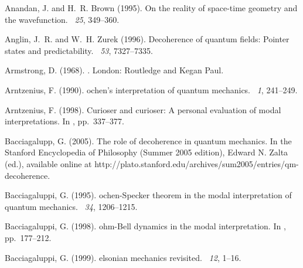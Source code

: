 \documentclass[12pt]{article}
\begin{document}
\begin{thebibliography}{}
Anandan, J. and H.~R. Brown (1995).
\newblock On the reality of space-time geometry and the wavefunction.
~{\em 25}, 349--360.

Anglin, J.~R. and W.~H. Zurek (1996).
\newblock Decoherence of quantum fields: Pointer states and predictability.
~{\em 53}, 7327--7335.

Armstrong, D. (1968).
.
\newblock London: Routledge and Kegan Paul.

Arntzenius, F. (1990).
ochen's interpretation of quantum mechanics.
~{\em 1},
  241--249.

Arntzenius, F. (1998).
\newblock Curioser and curioser: A personal evaluation of modal
  interpretations.
\newblock In , pp.\  337--377.

Bacciagalupp, G. (2005).
\newblock The role of decoherence in quantum mechanics.
\newblock In the Stanford Encyclopedia of Philosophy (Summer 2005 edition),
  Edward N. Zalta (ed.), available online at
  http://plato.stanford.edu/archives/sum2005/entries/qm-decoherence.

Bacciagaluppi, G. (1995).
ochen-{S}pecker theorem in the modal interpretation of quantum
  mechanics.
~{\em 34},
  1206--1215.

Bacciagaluppi, G. (1998).
ohm-{B}ell dynamics in the modal interpretation.
\newblock In , pp.\  177--212.

Bacciagaluppi, G. (1999).
elsonian mechanics revisited.
~{\em 12}, 1--16.


\end{thebibliography}
\end{document}
